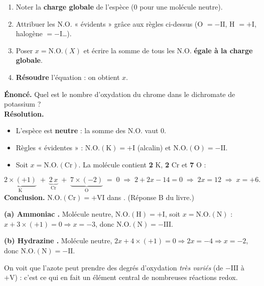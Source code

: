 \documentclass[11pt,a4paper]{article}
\newcommand{\NO}{\ensuremath{\mathrm{N.O.}}}    %
\begin{document}
\begin{methode}[calculer le $\NO$ d'un atome $X$]
\begin{enumerate}[label=\textbf{Étape \arabic*.},leftmargin=2.6em,topsep=2pt,itemsep=2pt]
  \item Noter la \textbf{charge globale} de l'espèce (0 pour une molécule neutre).
  \item Attribuer les $\NO$ « évidents » grâce aux règles ci-dessus (O $=-\mathrm{II}$,
        H $=+\mathrm{I}$, halogène $=-\mathrm{I}$\ldots).
  \item Poser $x=\NO(X)$ et écrire la somme de tous les $\NO$ \textbf{égale à la charge globale}.
  \item \textbf{Résoudre} l'équation : on obtient $x$.
\end{enumerate}
\end{methode}

\begin{exemple}
\textbf{Énoncé.} Quel est le nombre d'oxydation du chrome dans le dichromate de potassium  ?\\[2pt]
\textbf{Résolution.}
\begin{itemize}[leftmargin=1.6em,topsep=1pt,itemsep=1pt]
  \item L'espèce est \textbf{neutre} : la somme des $\NO$ vaut $0$.
  \item Règles « évidentes » : $\NO(\mathrm{K})=+\mathrm{I}$ (alcalin) et $\NO(\mathrm{O})=-\mathrm{II}$.
  \item Soit $x=\NO(\mathrm{Cr})$. La molécule contient \textbf{2} K, \textbf{2} Cr et \textbf{7} O :
\end{itemize}
\[
\underbrace{2\times(+1)}_{\text{K}}\;+\;\underbrace{2\,x}_{\text{Cr}}\;+\;\underbrace{7\times(-2)}_{\text{O}}\;=\;0
\;\Longrightarrow\;2+2x-14=0\;\Longrightarrow\;2x=12\;\Longrightarrow\;x=+6.
\]
\textbf{Conclusion.} $\NO(\mathrm{Cr})=+\mathrm{VI}$ dans . (Réponse B du livre.)
\end{exemple}

\begin{exemple}
\textbf{(a) Ammoniac .} Molécule neutre, $\NO(\mathrm{H})=+\mathrm{I}$, soit $x=\NO(\mathrm{N})$ :
$x+3\times(+1)=0\Rightarrow x=-3$, donc $\NO(\mathrm{N})=-\mathrm{III}$.

\textbf{(b) Hydrazine .} Molécule neutre, $2x+4\times(+1)=0\Rightarrow 2x=-4\Rightarrow x=-2$,
donc $\NO(\mathrm{N})=-\mathrm{II}$.

On voit que l'azote peut prendre des degrés d'oxydation \emph{très variés} (de $-\mathrm{III}$ à
$+\mathrm{V}$) : c'est ce qui en fait un élément central de nombreuses réactions redox.
\end{exemple}
\end{document}
